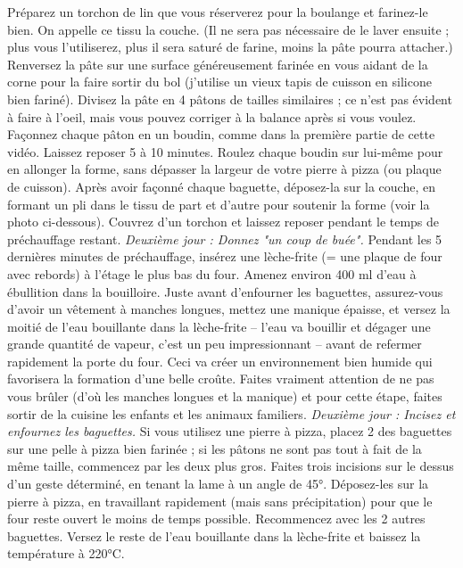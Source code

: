 \ingredient{}Préparez un torchon de lin que vous réserverez pour la boulange et farinez-le bien. On appelle ce tissu la couche. (Il ne sera pas nécessaire de le laver ensuite ; plus vous l'utiliserez, plus il sera saturé de farine, moins la pâte pourra attacher.)
\ingredient{}Renversez la pâte sur une surface généreusement farinée en vous aidant de la corne pour la faire sortir du bol (j'utilise un vieux tapis de cuisson en silicone bien fariné). Divisez la pâte en 4 pâtons de tailles similaires ; ce n'est pas évident à faire à l'oeil, mais vous pouvez corriger à la balance après si vous voulez.
\ingredient{}Façonnez chaque pâton en un boudin, comme dans la première partie de cette vidéo. Laissez reposer 5 à 10 minutes.
\ingredient{}Roulez chaque boudin sur lui-même pour en allonger la forme, sans dépasser la largeur de votre pierre à pizza (ou plaque de cuisson). Après avoir façonné chaque baguette, déposez-la sur la couche, en formant un pli dans le tissu de part et d'autre pour soutenir la forme (voir la photo ci-dessous). Couvrez d'un torchon et laissez reposer pendant le temps de préchauffage restant.
\ingredient{}
\ingredient{}\textit{Deuxième jour : Donnez "un coup de buée".}
\ingredient{}Pendant les 5 dernières minutes de préchauffage, insérez une lèche-frite (= une plaque de four avec rebords) à l'étage le plus bas du four. Amenez environ 400 ml d'eau à ébullition dans la bouilloire. Juste avant d'enfourner les baguettes, assurez-vous d'avoir un vêtement à manches longues, mettez une manique épaisse, et versez la moitié de l'eau bouillante dans la lèche-frite -- l'eau va bouillir et dégager une grande quantité de vapeur, c'est un peu impressionnant -- avant de refermer rapidement la porte du four.
\ingredient{}Ceci va créer un environnement bien humide qui favorisera la formation d'une belle croûte. Faites vraiment attention de ne pas vous brûler (d'où les manches longues et la manique) et pour cette étape, faites sortir de la cuisine les enfants et les animaux familiers.
\ingredient{}
\ingredient{}\textit{Deuxième jour : Incisez et enfournez les baguettes.}
\ingredient{}Si vous utilisez une pierre à pizza, placez 2 des baguettes sur une pelle à pizza bien farinée ; si les pâtons ne sont pas tout à fait de la même taille, commencez par les deux plus gros. Faites trois incisions sur le dessus d'un geste déterminé, en tenant la lame à un angle de 45°. Déposez-les sur la pierre à pizza, en travaillant rapidement (mais sans précipitation) pour que le four reste ouvert le moins de temps possible.
\ingredient{}Recommencez avec les 2 autres baguettes. Versez le reste de l'eau bouillante dans la lèche-frite et baissez la température à 220°C.
